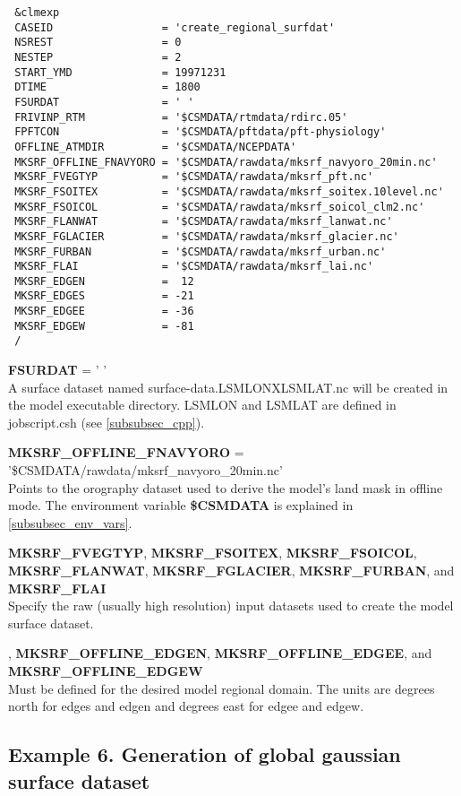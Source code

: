 \begin{verbatim}
 &clmexp     
 CASEID                 = 'create_regional_surfdat' 
 NSREST                 = 0 
 NESTEP                 = 2 
 START_YMD              = 19971231 
 DTIME                  = 1800 
 FSURDAT                = ' '   
 FRIVINP_RTM            = '$CSMDATA/rtmdata/rdirc.05' 
 FPFTCON                = '$CSMDATA/pftdata/pft-physiology' 
 OFFLINE_ATMDIR         = '$CSMDATA/NCEPDATA' 
 MKSRF_OFFLINE_FNAVYORO = '$CSMDATA/rawdata/mksrf_navyoro_20min.nc' 
 MKSRF_FVEGTYP          = '$CSMDATA/rawdata/mksrf_pft.nc' 
 MKSRF_FSOITEX          = '$CSMDATA/rawdata/mksrf_soitex.10level.nc' 
 MKSRF_FSOICOL          = '$CSMDATA/rawdata/mksrf_soicol_clm2.nc' 
 MKSRF_FLANWAT          = '$CSMDATA/rawdata/mksrf_lanwat.nc' 
 MKSRF_FGLACIER         = '$CSMDATA/rawdata/mksrf_glacier.nc' 
 MKSRF_FURBAN           = '$CSMDATA/rawdata/mksrf_urban.nc' 
 MKSRF_FLAI             = '$CSMDATA/rawdata/mksrf_lai.nc' 
 MKSRF_EDGEN            =  12 
 MKSRF_EDGES            = -21 
 MKSRF_EDGEE            = -36 
 MKSRF_EDGEW            = -81 
 /   
\end{verbatim}

\medskip \noindent 
{\bf FSURDAT} = ' ' \\ 
A surface dataset named surface-data.LSMLONXLSMLAT.nc will be created
in the model executable directory. LSMLON and LSMLAT are defined in
jobscript.csh (see \ref{subsubsec_cpp}).

\medskip \noindent
{\bf MKSRF\_OFFLINE\_FNAVYORO} = '\$CSMDATA/rawdata/mksrf\_navyoro\_20min.nc'\\ 
Points to the orography dataset used to derive the model's land mask
in offline mode.  The environment variable {\bf \$CSMDATA} is
explained in \ref{subsubsec_env_vars}.

\medskip \noindent 
{\bf MKSRF\_FVEGTYP}, {\bf MKSRF\_FSOITEX}, {\bf MKSRF\_FSOICOL}, {\bf
MKSRF\_FLANWAT}, {\bf MKSRF\_FGLACIER}, {\bf MKSRF\_FURBAN}, and {\bf
MKSRF\_FLAI} \\ 
Specify the raw (usually high resolution) input datasets used to
create the model surface dataset.

\medskip {}, {\bf MKSRF\_OFFLINE\_EDGEN}, {\bf
MKSRF\_OFFLINE\_EDGEE}, and {\bf MKSRF\_OFFLINE\_EDGEW} \\ 
Must be defined for the desired model regional domain.  The units are
degrees north for edges and edgen and degrees east for edgee and
edgew.

\subsection {Example 6. Generation of global gaussian surface dataset}

